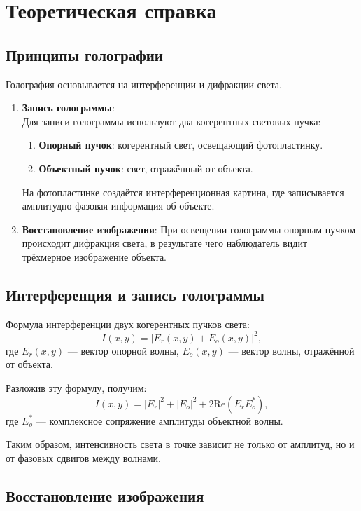 \documentclass[aps,twocolumn,secnumarabic,balancelastpage,amsmath,amssymb,nofootinbib, floatfix]{revtex4-1}
\begin{document}
\section{Теоретическая справка} 

\subsection{Принципы голографии} 

Голография основывается на интерференции и дифракции света.  
\begin{enumerate}
	\item \textbf{Запись голограммы}:\\
	Для записи голограммы используют два когерентных световых пучка:  
	\begin{enumerate}
		\item \textbf{Опорный пучок}: когерентный свет, освещающий фотопластинку.  
		\item \textbf{Объектный пучок}: свет, отражённый от объекта.  
	\end{enumerate}
На фотопластинке создаётся интерференционная картина, где записывается амплитудно-фазовая информация об объекте.  
	\item \textbf{Восстановление изображения}:  
	При освещении голограммы опорным пучком происходит дифракция света, в результате чего наблюдатель видит трёхмерное изображение объекта.  
	
\end{enumerate}

\subsection{Интерференция и запись голограммы}

Формула интерференции двух когерентных пучков света:  
\[
I(x, y) = |E_r(x, y) + E_o(x, y)|^2,
\]  
где \(E_r(x, y)\) — вектор опорной волны, \(E_o(x, y)\) — вектор волны, отражённой от объекта.  

Разложив эту формулу, получим:  
\[
I(x, y) = |E_r|^2 + |E_o|^2 + 2 \text{Re}(E_r E_o^*),
\]  
где \(E_o^*\) — комплексное сопряжение амплитуды объектной волны.  

Таким образом, интенсивность света в точке зависит не только от амплитуд, но и от фазовых сдвигов между волнами.  

\subsection{Восстановление изображения}
\end{document}
